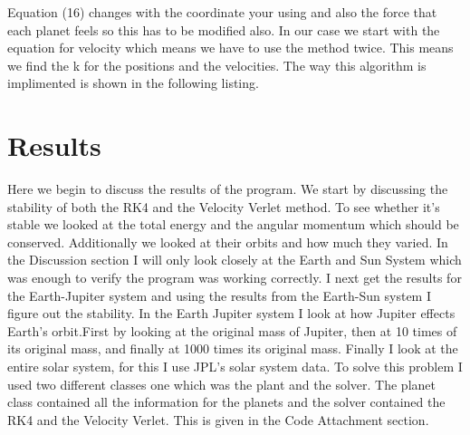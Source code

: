 \documentclass[11pt,a4wide]{article}
\begin{document}
	Equation (16) changes with the coordinate your using and also the force that each planet feels so this has to be modified also. In our case we start with the equation for velocity which means we have to use the method twice. This means we find the k for the positions and the velocities. The way this algorithm is implimented is shown in the following listing.
	


\section{Results}

	Here we begin to discuss the results of the program. We start by discussing the stability of both the RK4 and the Velocity Verlet method. To see whether it's stable we looked at the total energy and the angular momentum which should be conserved. Additionally we looked at their orbits and how much they varied. In the Discussion section I will only look closely at the Earth and Sun System which was enough to verify the program was working correctly. I next get the results for the Earth-Jupiter system and using the results from the Earth-Sun system I figure out the stability. In the Earth Jupiter system I look at how Jupiter effects Earth's orbit.First by looking at the original mass of Jupiter, then at 10 times of its original mass, and finally at 1000 times its original mass. Finally I look at the entire solar system, for this I use JPL's solar system data. To solve this problem I used two different classes one which was the plant and the solver. The planet class contained all the information for the planets and the solver contained the RK4 and the Velocity Verlet. This is given in the Code Attachment section. 


\end{document}
